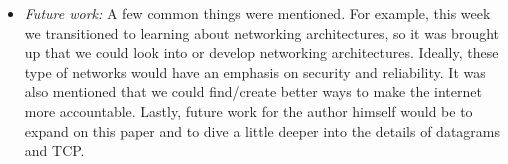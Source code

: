 \documentclass[letterpaper,twocolumn,10pt]{article}
\begin{document}
\begin{itemize}
\item {\it Future work:}
A few common things
were mentioned. For example, this week we transitioned to learning about networking architectures,
so it was brought up that we could look into or develop networking architectures. Ideally, these type
of networks would have an emphasis on security and reliability. It was also mentioned that we could 
find/create better ways to make the internet more accountable. Lastly, future work for the author himself
would be to expand on this paper and to dive a little deeper into the details of datagrams and TCP. 

\end{itemize}
\end{document}
